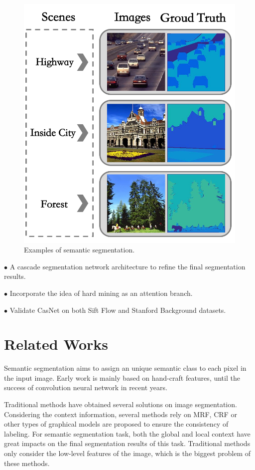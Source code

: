 \documentclass[10.5pt,compsoc]{TsT}
\newcommand{\upcite}[1]{\superscript{\textsuperscript{\cite{#1}}}}
\theoremstyle{mystyle}
\newcommand{\upcite}[1]{\textsuperscript{\cite{#1}}}
\begin{document}
{\begin{figure}
\centering
\includegraphics[width=0.95\columnwidth]{fig1.png}
\caption{Examples of semantic segmentation.}
\label{fig:example}
\end{figure} 


\noindent
  $\bullet$ A cascade segmentation network architecture to refine the final segmentation results.
  
\noindent
  $\bullet$ Incorporate the idea of hard mining as an attention branch.
  
\noindent
  $\bullet$ Validate CasNet on both Sift Flow\upcite{6} and Stanford Background\upcite{7} datasets.


\section{Related Works}
\label{s:Related}
\noindent
Semantic segmentation aims to assign an unique semantic class to each pixel in the input image. Early work is mainly based on hand-craft features, until the success of convolution neural network in recent years. 

Traditional methods have obtained several solutions on image segmentation. Considering the context information, several methods rely on MRF, CRF or other types of graphical models are proposed to ensure the consistency of labeling\upcite{8-10}. For semantic segmentation task, both the global and local context have great impacts on the final segmentation results of this task. Traditional methods only consider the low-level features of the image, which is the biggest problem of these methods.

}
\end{document}
